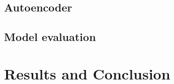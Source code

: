 \documentclass[9pt,technote]{IEEEtran}
\begin{document}
\subsection{Autoencoder}


\subsection{Model evaluation}


\section{Results and Conclusion}
\end{document}
